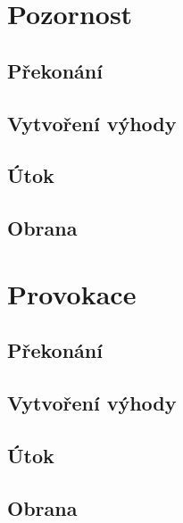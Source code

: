 \documentclass[../main.tex]{subfiles}
\begin{document}
\section{Pozornost}
\label{sec:pozornost}

\subsection*{Překonání}
\label{subsec:pozornost-prekonani}
\prekonani

\subsection*{Vytvoření výhody}
\label{subsec:pozornost-vytvoreni}
\vytvoreni

\subsection*{Útok}
\label{subsec:pozornost-utok}
\utok

\subsection*{Obrana}
\label{subsec:pozornost-obrana}
\obrana

\section{Provokace}
\label{sec:provokace}

\subsection*{Překonání}
\label{subsec:provokace-prekonani}
\prekonani

\subsection*{Vytvoření výhody}
\label{subsec:provokace-vytvoreni}
\vytvoreni

\subsection*{Útok}
\label{subsec:provokace-utok}
\utok

\subsection*{Obrana}
\label{subsec:provokace-obrana}
\obrana
\end{document}
